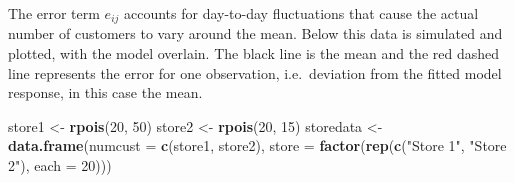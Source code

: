 \documentclass[
  letterpaper,
]{book}
\newenvironment{Shaded}{\begin{snugshade}}{\end{snugshade}}
\newcommand{\AttributeTok}[1]{\textcolor[rgb]{0.13,0.29,0.53}{#1}}
\newcommand{\DecValTok}[1]{\textcolor[rgb]{0.00,0.00,0.81}{#1}}
\newcommand{\FunctionTok}[1]{\textcolor[rgb]{0.13,0.29,0.53}{\textbf{#1}}}
\newcommand{\NormalTok}[1]{#1}
\newcommand{\OtherTok}[1]{\textcolor[rgb]{0.56,0.35,0.01}{#1}}
\newcommand{\StringTok}[1]{\textcolor[rgb]{0.31,0.60,0.02}{#1}}
\begin{document}
The error term \(e_{ij}\) accounts for day-to-day fluctuations that
cause the actual number of customers to vary around the mean. Below this
data is simulated and plotted, with the model overlain. The black line
is the mean and the red dashed line represents the error for one
observation, i.e.~deviation from the fitted model response, in this case
the mean.

\begin{Shaded}
\begin{Highlighting}[]
\NormalTok{store1 }\OtherTok{\textless{}{-}} \FunctionTok{rpois}\NormalTok{(}\DecValTok{20}\NormalTok{, }\DecValTok{50}\NormalTok{)}
\NormalTok{store2 }\OtherTok{\textless{}{-}} \FunctionTok{rpois}\NormalTok{(}\DecValTok{20}\NormalTok{, }\DecValTok{15}\NormalTok{)}
\NormalTok{storedata }\OtherTok{\textless{}{-}} \FunctionTok{data.frame}\NormalTok{(}\AttributeTok{numcust =} \FunctionTok{c}\NormalTok{(store1, store2),}
                        \AttributeTok{store =} \FunctionTok{factor}\NormalTok{(}\FunctionTok{rep}\NormalTok{(}\FunctionTok{c}\NormalTok{(}\StringTok{"Store 1"}\NormalTok{, }\StringTok{"Store 2"}\NormalTok{), }\AttributeTok{each =} \DecValTok{20}\NormalTok{)))}


\end{Highlighting}
\end{Shaded}
\end{document}
